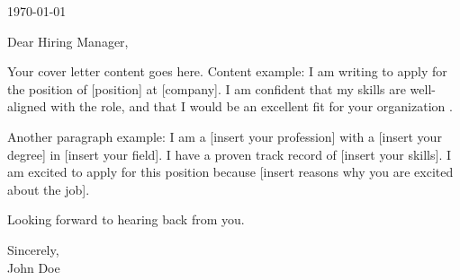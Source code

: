 \documentclass[12pt,a4paper,ragged2e,withhyper]{altacv}
\begin{document}
    \tagline{}
    
    
    \makecoverheader

    \bigskip
    
    \today

    \bigskip

    Dear Hiring Manager,

    \smallskip

    {\justify

    Your cover letter content goes here. Content example: I am writing to apply for the position of [position] at [company]. I am confident that my skills are well-aligned with the role, and that I would be an excellent fit for your organization \cite{else:lim:2010}.

    \bigskip

    Another paragraph example: I am a [insert your profession] with a [insert your degree] in [insert your field]. I have a proven track record of [insert your skills]. I am excited to apply for this position because [insert reasons why you are excited about the job].

    }

    \bigskip

    Looking forward to hearing back from you.

    \bigskip
    \medskip

    {\hspace{10cm}Sincerely,\\
    \hspace{10cm}John Doe}

    \bigskip
    \printbibliography[heading=subbibliography]
\end{document}
